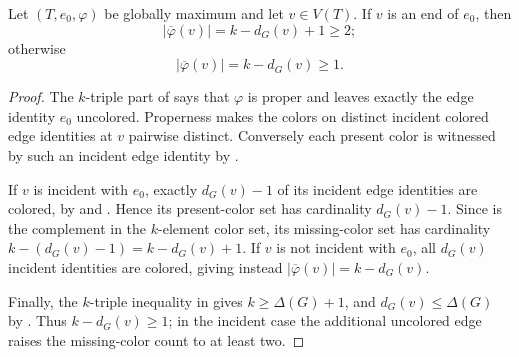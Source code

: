\begin{lemma}
Let $(T,e_0,\varphi)$ be globally maximum and let $v\in V(T)$.  If $v$ is
an end of $e_0$, then
\[
 |\overline\varphi(v)|=k-d_G(v)+1\geq2;
\]
otherwise
\[
 |\overline\varphi(v)|=k-d_G(v)\geq1.
\]
\end{lemma}
\begin{proof}
The $k$-triple part of  says that $\varphi$ is
proper and leaves exactly the edge identity $e_0$ uncolored.  Properness
makes the colors on distinct incident colored edge identities at $v$
pairwise distinct.  Conversely each present color is witnessed by such an
incident edge identity by .

If $v$ is incident with $e_0$, exactly $d_G(v)-1$ of its incident edge
identities are colored, by  and
.  Hence its present-color set has cardinality
$d_G(v)-1$.  Since  is the complement in the
$k$-element color set, its missing-color set has cardinality
$k-(d_G(v)-1)=k-d_G(v)+1$.  If $v$ is not incident with $e_0$, all
$d_G(v)$ incident identities are colored, giving instead
$|\overline\varphi(v)|=k-d_G(v)$.

Finally, the $k$-triple inequality in  gives
$k\geq\Delta(G)+1$, and $d_G(v)\leq\Delta(G)$ by
.  Thus $k-d_G(v)\geq1$; in the incident case the
additional uncolored edge raises the missing-color count to at least two.
\end{proof}
